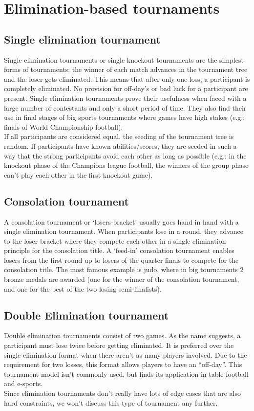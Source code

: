 \section{Elimination-based tournaments}
\subsection{Single elimination tournament}
Single elimination tournaments or single knockout tournaments are the simplest forms of tournaments: the winner of each match advances in the tournament tree and the loser gets eliminated. This means that after only one loss, a participant is completely eliminated. No provision for off-day’s or bad luck for a participant are present. Single elimination tournaments prove their usefulness when faced with a large number of contestants and only a short period of time. They also find their use in final stages of big sports tournaments where games have high stakes (e.g.: finals of World Championship football).
\\[5px]
If all participants are considered equal, the seeding of the tournament tree is random. If participants have known abilities/scores, they are seeded in such a way that the strong participants avoid each other as long as possible (e.g.: in the knockout phase of the Champions league football, the winners of the group phase can’t play each other in the first knockout game).  

\subsection{Consolation tournament}
A consolation tournament or ‘losers-bracket’ usually goes hand in hand with a single elimination tournament. When participants lose in a round, they advance to the loser bracket where they compete each other in a single elimination principle for the consolation title. A ‘feed-in’ consolation tournament enables losers from the first round up to losers of the quarter finals to compete for the consolation title. The most famous example is judo, where in big tournaments 2 bronze medals are awarded (one for the winner of the consolation tournament, and one for the best of the two losing semi-finalists).

\subsection{Double Elimination tournament}
Double elimination tournaments consist of two games. As the name suggests, a participant must lose twice before getting eliminated. It is preferred over the single elimination format when there aren’t as many players involved. Due to the requirement for two losses, this format allows players to have an “off-day”. This tournament model isn’t commonly used, but finds its application in table football and e-sports.
\\[5px]
Since elimination tournaments don’t really have lots of edge cases that are also hard constraints, we won’t discuss this type of tournament any further.
